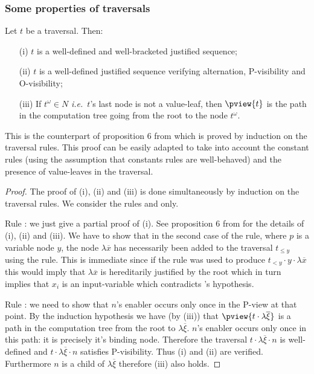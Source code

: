 \subsubsection{Some properties of traversals}

\begin{proposition}
\label{prop:pviewtrav_is_path}
Let $t$ be a traversal. Then:
\begin{itemize}
\item[(i)] $t$ is a well-defined and well-bracketed justified sequence;
\item[(ii)] $t$ is a well-defined justified sequence verifying alternation, P-visibility and O-visibility;
\item[(iii)] If $t^\omega \in N$ {\it i.e.}~$t$'s last node is not a value-leaf, then $\pview{t}$ is the path in the computation tree going from the root to the node $t^\omega$.
\end{itemize}
\end{proposition}

This is the counterpart of proposition 6 from
\cite{OngHoMchecking2006} which is proved by induction on the
traversal rules. This proof can be easily adapted to take into
account the constant rules (using the assumption that constants
rules are well-behaved) and the presence of value-leaves in the
traversal.
\begin{proof}
The proof of (i), (ii) and (iii) is done simultaneously by induction on the traversal rules. We consider the rules  and  only.

Rule : we just give a partial proof of (i). See proposition 6 from \cite{OngHoMchecking2006} for the details of (i), (ii) and (iii). We have to show that in the second case of the  rule, where $p$ is a variable node $y$, the node $\lambda \overline{x}$ has necessarily been added to the traversal $t_{\leq y}$ using the  rule. This is immediate since if the rule  was used to produce $t_{<y} \cdot y \cdot \lambda \overline{x}$ this would imply that $\lambda \overline{x}$ is hereditarily justified by the root which in turn implies that $x_i$ is an input-variable which contradicts 's hypothesis.

Rule : we need to show that $n$'s enabler occurs only once in the P-view at that point. By the induction hypothesis we have (by (iii)) that $\pview{t \cdot \lambda \overline{\xi}}$ is a path in the computation tree from the root to $\lambda \overline{\xi}$. $n$'s enabler occurs only once in this path: it is precisely it's binding node. Therefore the traversal $t \cdot \lambda \overline{\xi} \cdot n$ is well-defined and $t \cdot \lambda \overline{\xi} \cdot n$ satisfies P-visibility. Thus (i) and (ii) are verified. Furthermore $n$ is a child of $\lambda \overline{\xi}$ therefore (iii) also holds.
\end{proof}

